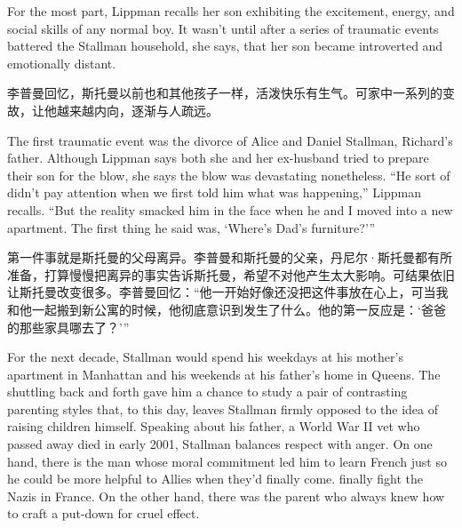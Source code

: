 \ifdefined\eng
For the most part, Lippman recalls her son exhibiting the excitement, energy, and social skills of any normal boy. It wasn't until after a series of traumatic events battered the Stallman household, she says, that her son became introverted and emotionally distant.
\fi

\ifdefined\chs
李普曼回忆，斯托曼以前也和其他孩子一样，活泼快乐有生气。可家中一系列的变故，让他越来越内向，逐渐与人疏远。
\fi

\ifdefined\eng
The first traumatic event was the divorce of Alice and Daniel Stallman, Richard's father. Although Lippman says both she and her ex-husband tried to prepare their son for the blow, she says the blow was devastating nonetheless. ``He sort of didn't pay attention when we first told him what was happening,'' Lippman recalls. ``But the reality smacked him in the face when he and I moved into a new apartment. The first thing he said was, `Where's Dad's furniture?'\hspace{0.01in}''
\fi

\ifdefined\chs
第一件事就是斯托曼的父母离异。李普曼和斯托曼的父亲，丹尼尔·斯托曼都有所准备，打算慢慢把离异的事实告诉斯托曼，希望不对他产生太大影响。可结果依旧让斯托曼改变很多。李普曼回忆：``他一开始好像还没把这件事放在心上，可当我和他一起搬到新公寓的时候，他彻底意识到发生了什么。他的第一反应是：`爸爸的那些家具哪去了？'\hspace{0.01in}''
\fi

\ifdefined\eng
For the next decade, Stallman would spend his weekdays at his mother's apartment in Manhattan and his weekends at his father's home in Queens. The shuttling back and forth gave him a chance to study a pair of contrasting parenting styles that, to this day, leaves Stallman firmly opposed to the idea of raising children himself. Speaking about his father, a World War II vet who \ifdefined\vone passed away \fi\ifdefined\vtwo died \fi in early 2001, Stallman balances respect with anger. On one hand, there is the man whose moral commitment led him to learn French just so he could be more helpful to Allies when they'd \ifdefined\vone finally come. \fi\ifdefined\vtwo finally fight the Nazis in France. \fi On the other hand, there was the parent who always knew how to craft a put-down for cruel effect.
\fi

